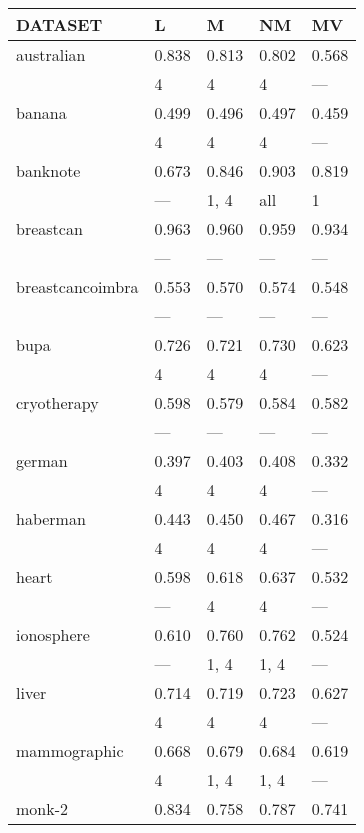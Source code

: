 \begin{tabular}{lllll}
\toprule
 DATASET          & L     & M     & NM    & MV    \\
\midrule
 australian       & 0.838 & 0.813 & 0.802 & 0.568 \\
                  & 4     & 4     & 4     & ---   \\
 banana           & 0.499 & 0.496 & 0.497 & 0.459 \\
                  & 4     & 4     & 4     & ---   \\
 banknote         & 0.673 & 0.846 & 0.903 & 0.819 \\
                  & ---   & 1, 4  & all   & 1     \\
 breastcan        & 0.963 & 0.960 & 0.959 & 0.934 \\
                  & ---   & ---   & ---   & ---   \\
 breastcancoimbra & 0.553 & 0.570 & 0.574 & 0.548 \\
                  & ---   & ---   & ---   & ---   \\
 bupa             & 0.726 & 0.721 & 0.730 & 0.623 \\
                  & 4     & 4     & 4     & ---   \\
 cryotherapy      & 0.598 & 0.579 & 0.584 & 0.582 \\
                  & ---   & ---   & ---   & ---   \\
 german           & 0.397 & 0.403 & 0.408 & 0.332 \\
                  & 4     & 4     & 4     & ---   \\
 haberman         & 0.443 & 0.450 & 0.467 & 0.316 \\
                  & 4     & 4     & 4     & ---   \\
 heart            & 0.598 & 0.618 & 0.637 & 0.532 \\
                  & ---   & 4     & 4     & ---   \\
 ionosphere       & 0.610 & 0.760 & 0.762 & 0.524 \\
                  & ---   & 1, 4  & 1, 4  & ---   \\
 liver            & 0.714 & 0.719 & 0.723 & 0.627 \\
                  & 4     & 4     & 4     & ---   \\
 mammographic     & 0.668 & 0.679 & 0.684 & 0.619 \\
                  & 4     & 1, 4  & 1, 4  & ---   \\
 monk-2           & 0.834 & 0.758 & 0.787 & 0.741 \\

\end{tabular}
